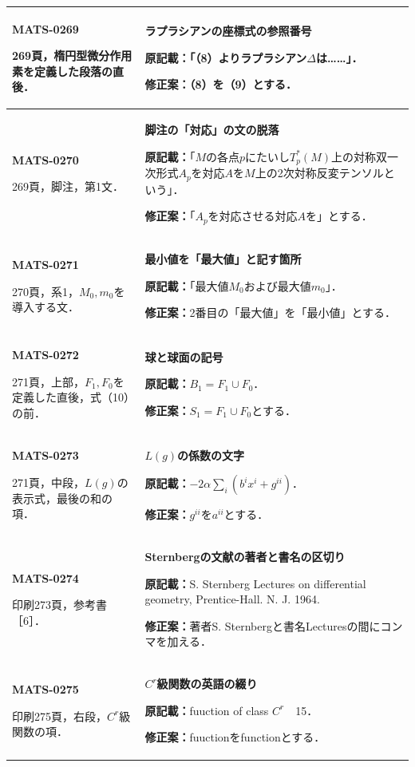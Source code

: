 \documentclass[a4paper,10pt]{ltjsarticle}
\begin{document}
\begin{longtable}{@{}>{\raggedright\arraybackslash}p{.19\linewidth}>{\raggedright\arraybackslash}p{.77\linewidth}@{}}
\hline
\hypertarget{MATS-0269}{}\textbf{MATS-0269}\par 269頁，楕円型微分作用素を定義した段落の直後． & \textbf{ラプラシアンの座標式の参照番号}\par\textbf{原記載：}「（8）よりラプラシアン$\Delta$は……」．\par\textbf{修正案：}（8）を（9）とする． \\[3pt]
\hline
\hypertarget{MATS-0270}{}\textbf{MATS-0270}\par 269頁，脚注，第1文． & \textbf{脚注の「対応」の文の脱落}\par\textbf{原記載：}「$M$の各点$p$にたいし$T_p^*(M)$上の対称双一次形式$A_p$を対応$A$を$M$上の2次対称反変テンソルという」．\par\textbf{修正案：}「$A_p$を対応させる対応$A$を」とする． \\[3pt]
\hline
\hypertarget{MATS-0271}{}\textbf{MATS-0271}\par 270頁，系1，$M_0,m_0$を導入する文． & \textbf{最小値を「最大値」と記す箇所}\par\textbf{原記載：}「最大値$M_0$および最大値$m_0$」．\par\textbf{修正案：}2番目の「最大値」を「最小値」とする． \\[3pt]
\hline
\hypertarget{MATS-0272}{}\textbf{MATS-0272}\par 271頁，上部，$F_1,F_0$を定義した直後，式（10）の前． & \textbf{球と球面の記号}\par\textbf{原記載：}$B_1=F_1\cup F_0$．\par\textbf{修正案：}$S_1=F_1\cup F_0$とする． \\[3pt]
\hline
\hypertarget{MATS-0273}{}\textbf{MATS-0273}\par 271頁，中段，$L(g)$の表示式，最後の和の項． & \textbf{$L(g)$の係数の文字}\par\textbf{原記載：}$\displaystyle-2\alpha\sum_i(b^ix^i+g^{ii})$．\par\textbf{修正案：}$g^{ii}$を$a^{ii}$とする． \\[3pt]
\hline
\hypertarget{MATS-0274}{}\textbf{MATS-0274}\par 印刷273頁，参考書［6］． & \textbf{Sternbergの文献の著者と書名の区切り}\par\textbf{原記載：}S. Sternberg Lectures on differential geometry, Prentice-Hall. N. J. 1964.\par\textbf{修正案：}著者S. Sternbergと書名Lecturesの間にコンマを加える． \\[3pt]
\hline
\hypertarget{MATS-0275}{}\textbf{MATS-0275}\par 印刷275頁，右段，$C^r$級関数の項． & \textbf{$C^r$級関数の英語の綴り}\par\textbf{原記載：}fuuction of class $C^r$　15．\par\textbf{修正案：}fuuctionをfunctionとする． \\[3pt]

\end{longtable}
\end{document}
